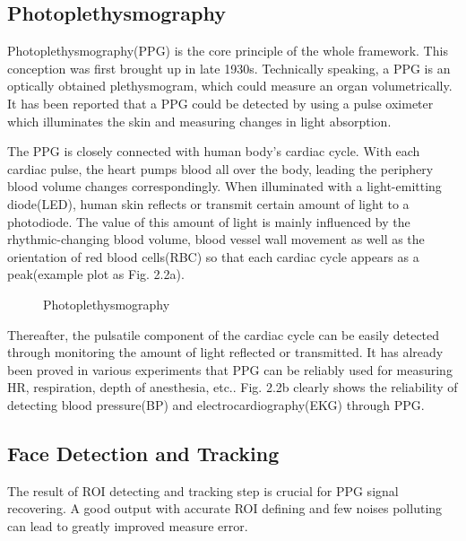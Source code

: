 \subsection{Photoplethysmography}
Photoplethysmography(PPG) is the core principle of the whole framework. This conception was first brought up in late 1930s\cite{hertzman1937photoelectric}. Technically speaking, a PPG is an optically obtained plethysmogram, which could measure an organ volumetrically. It has been reported that a PPG could be detected by using a pulse oximeter which illuminates the skin and measuring changes in light absorption\cite{shelley2001pulse}. 

The PPG is closely connected with human body's cardiac cycle. With each cardiac pulse, the heart pumps blood all over the body, leading the periphery blood volume changes correspondingly. When illuminated with a light-emitting diode(LED), human skin reflects or transmit certain amount of light to a photodiode. The value of this amount of light is mainly influenced by the rhythmic-changing blood volume, blood vessel wall movement as well as the orientation of red blood cells(RBC)\cite{allen2007photoplethysmography} so that each cardiac cycle appears as a peak(example plot as Fig. 2.2a).  


\begin{figure}[ht]
\hspace{-0.5in}
\caption{Photoplethysmography }\label{fig:noted-figure}
\end{figure}

Thereafter, the pulsatile component of the cardiac cycle can be easily detected through monitoring the amount of light reflected or transmitted. It has already been proved in various experiments that PPG can be reliably used for measuring HR, respiration, depth of anesthesia, etc.\cite{allen2007photoplethysmography}. Fig. 2.2b clearly shows the reliability of detecting blood pressure(BP) and electrocardiography(EKG) through PPG.


\subsection{Face Detection and Tracking}
The result of ROI detecting and tracking step is crucial for PPG signal recovering. A good output with accurate ROI defining and few noises polluting can lead to greatly improved measure error.

